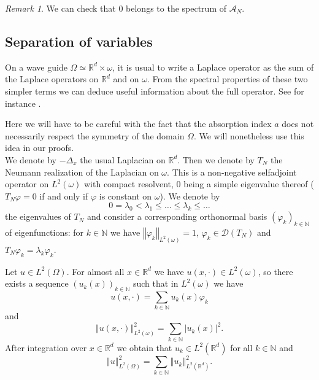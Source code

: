 \documentclass[10pt, a4paper,reqno]{amsart}
\theoremstyle{plain}
\theoremstyle{definition}
\theoremstyle{remark}
\newtheorem{remark}[theorem]{Remark}
\begin{document}
\begin{remark}
We can check that 0 belongs to the spectrum of ${{{\mathcal A}}_N}$.
\end{remark}

\subsection{Separation of variables} \label{sec-separation-variables}

On a wave guide ${\Omega} \simeq {\mathbb{R}}^d \times {\omega}$, it is usual to write a Laplace operator as the sum of the Laplace operators on ${\mathbb{R}}^d$ and on ${\omega}$. From the spectral properties of these two simpler terms we can deduce useful information about the full operator. See for instance \cite{KrejcirikKr05,borisovk08,KrejcirikRa14,royer-diss-wave-guide}.

Here we will have to be careful with the fact that the absorption index $a$ does not necessarily respect the symmetry of the domain ${\Omega}$. We will nonetheless use this idea in our proofs.\\

We denote by $-{{\Delta}_x}$ the usual Laplacian on ${\mathbb{R}}^d$. Then we denote by ${T_N}$ the Neumann realization of the Laplacian on ${\omega}$. This is a non-negative selfadjoint operator on $L^2({\omega})$ with compact resolvent, 0 being a simple eigenvalue thereof (${T_N}{\varphi} = 0$ if and only if ${\varphi}$ is constant on ${\omega}$). We denote by 
\[
0 = {\lambda}_0 < {\lambda}_1 {\leqslant} \dots {\leqslant} {\lambda}_k {\leqslant} \dots
\]
the eigenvalues of ${T_N}$ and consider a corresponding orthonormal basis ${\left({{\varphi}}_{k}\right)_{k \in{\mathbb{N}}}}$ of eigenfunctions: for $k \in {\mathbb{N}}$ we have ${\left\Vert {{\varphi}_k}\right\Vert}_{L^2({\omega})} = 1$, ${\varphi}_k \in {{\mathcal D}}({T_N})$ and ${T_N} {\varphi}_k = {\lambda}_k {\varphi}_k$.

Let $u \in L^2({\Omega})$. For almost all $x \in {\mathbb{R}}^d$ we have $u(x,\cdot) \in L^2({\omega})$, so there exists a sequence $(u_k(x))_{k \in {\mathbb{N}}}$ such that in $L^2({\omega})$ we have
\begin{equation} \label{def-uk}
u(x,\cdot) = \sum_{k\in{\mathbb{N}}} u_k(x) {\varphi}_k
\end{equation}
and
\[
{\left\Vert {u(x,\cdot)}\right\Vert}_{L^2({\omega})}^2 = \sum_{k \in {\mathbb{N}}} {\left\vert {u_k(x)}\right\vert}^2.
\]
After integration over $x \in {\mathbb{R}}^d$ we obtain that $u_k \in L^2({\mathbb{R}}^d)$ for all $k \in {\mathbb{N}}$ and 
\[
{\left\Vert {u}\right\Vert}_{L^2({\Omega})}^2 = \sum_{k\in{\mathbb{N}}} {\left\Vert {u_k}\right\Vert}_{L^2({\mathbb{R}}^d)}^2.
\]
\end{document}
